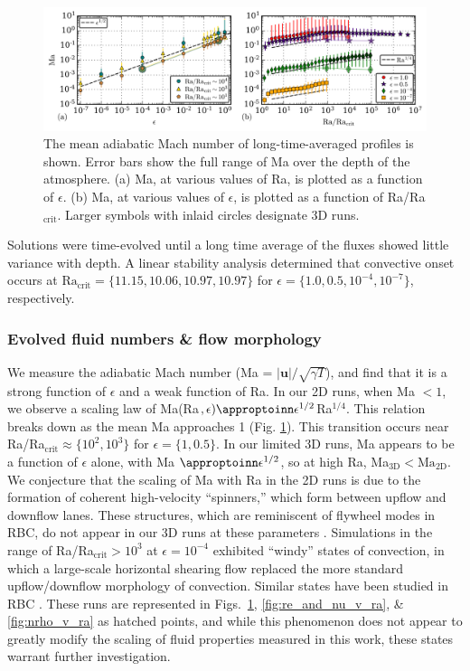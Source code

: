 \begin{figure}[t]
\includegraphics[width=\textwidth]{./figs/ma_v_Ra.pdf}
\caption[Mach number scaling in polytropic solutions.]
{
	The mean adiabatic Mach number of long-time-averaged profiles is shown.  
	Error bars show the full range of Ma over the depth of the atmosphere.
	(a) Ma, at various values of Ra, is plotted as a function of $\epsilon$.
	(b) Ma, at various values of $\epsilon$, is plotted as a function of Ra/Ra$_{\text{crit}}$.
	Larger symbols with inlaid circles designate 3D runs.
	\label{fig:ma_v_eps} 
}
\end{figure}


Solutions were time-evolved until a long time average of the fluxes showed little variance with depth.
A linear stability analysis determined that convective onset occurs at $\text{Ra}_{\text{crit}} = \{11.15, 10.06, 10.97, 10.97\}$ for $\epsilon = \{1.0, 0.5, 10^{-4}, 10^{-7}\}$, respectively.  

\subsubsection{Evolved fluid numbers \& flow morphology}

We measure the adiabatic Mach number (Ma = $|\bm{u}|/\sqrt{\gamma T}$), and find that it is a strong function of $\epsilon$ and a weak function of Ra.  
In our 2D runs, when Ma $< 1$, we observe a scaling law of Ma(Ra$, \epsilon) \appropto \epsilon^{1/2}$Ra$^{1/4}$.
This relation breaks down as the mean Ma approaches 1 (Fig. \ref{fig:ma_v_eps}).  
This transition occurs near Ra/Ra$_\text{crit} \approx \{10^{2}, 10^{3}\}$ for $\epsilon = \{1, 0.5\}$.
In our limited 3D runs, Ma appears to be a function of $\epsilon$ alone, with Ma $\appropto \epsilon^{1/2}$, so at high Ra, Ma$_{\text{3D}} < \text{Ma}_{\text{2D}}$.
We conjecture that the scaling of Ma with Ra in the 2D runs is due to the formation of coherent high-velocity ``spinners,'' which form between upflow and downflow lanes.  
These structures, which are reminiscent of flywheel modes in RBC, do not appear in our 3D runs at these parameters \citep{jones&all1976, brummell&all2002}.
Simulations in the range of Ra/Ra$_{\text{crit}} > 10^3$ at $\epsilon = 10^{-4}$ exhibited ``windy'' states of convection, in which a large-scale horizontal shearing flow replaced the more standard upflow/downflow morphology of convection.  
Similar states have been studied in RBC \citep{goluskin&all2014}.  
These runs are represented in Figs.~\ref{fig:ma_v_eps}, \ref{fig:re_and_nu_v_ra}, \& \ref{fig:nrho_v_ra} as hatched points, and while this phenomenon does not appear to greatly modify the scaling of fluid properties measured in this work, these states warrant further investigation.

